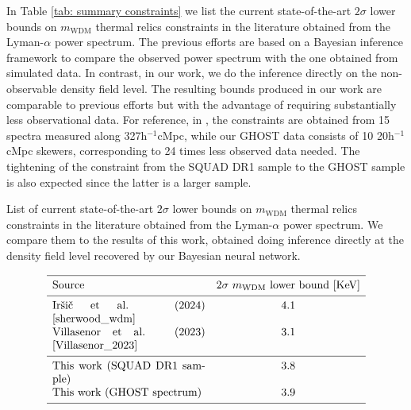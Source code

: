 In Table \ref{tab: summary constraints} we list the current state-of-the-art $2\sigma$ lower bounds on $m_{\mathrm{WDM}}$ thermal relics constraints in the literature obtained from the Lyman-$\alpha$ power spectrum. The previous efforts are based on a Bayesian inference framework to compare the observed power spectrum with the one obtained from simulated data. In contrast, in our work, we do the inference directly on the non-observable density field level. The resulting bounds produced in our work are comparable to previous efforts but with the advantage of requiring substantially less observational data. For reference, in \cite{sherwood_wdm}, the constraints are obtained from 15 spectra measured along 327h$^{-1}$cMpc, while our GHOST data consists of 10 20h$^{-1}$cMpc skewers, corresponding to 24 times less observed data needed. The tightening of the constraint from the SQUAD DR1 sample to the GHOST sample is also expected since the latter is a larger sample.
\begin{table}[ht!]
    \caption[]{List of  current state-of-the-art $2\sigma$ lower bounds on $m_{\mathrm{WDM}}$ thermal relics constraints in the literature obtained from the Lyman-$\alpha$ power spectrum. We compare them to the results of this work, obtained doing inference directly at the density field level recovered by our Bayesian neural network. }
       \label{tab: summary constraints}
   $$ 
       \begin{array}{p{0.4\textwidth}c}
          \hline
          \noalign{\smallskip}
          Source &  2\sigma\ m_{\mathrm{WDM}} \mathrm{{\ lower \ bound\ [KeV]}}  \\ 
          \noalign{\smallskip}
          \hline
          \noalign{\smallskip}
          Ir\v{s}i\v{c} et al. (2024) \cite{sherwood_wdm} & 4.1      \\
          Villasenor et al. (2023) \cite{Villasenor_2023} & 3.1      \\
          \noalign{\smallskip}
          \hline
          \noalign{\smallskip}
          This work (SQUAD DR1 sample)  & 3.8   \\
          This work (GHOST spectrum)  & 3.9        \\

          \noalign{\smallskip}
          \hline
       \end{array}
   $$ 
 \end{table}















